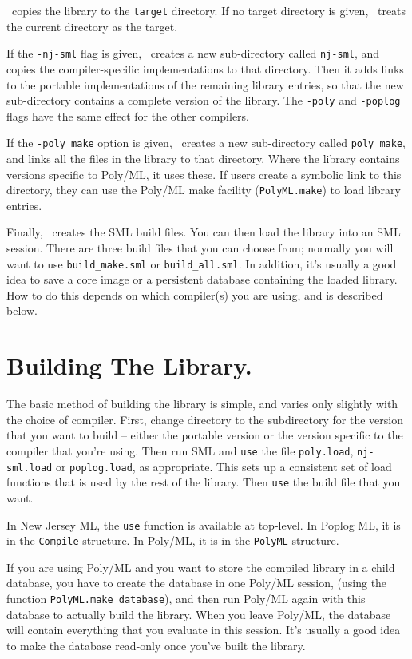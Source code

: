 \install\ copies the library to the {\tt target} directory.
If no target directory is given,
\install\ treats the current directory as the target.

If the {\tt -nj-sml} flag is given, \install\ creates a new
sub-directory called {\tt nj-sml}, and copies the compiler-specific
implementations to that directory.  Then it adds links to the
portable implementations of the remaining library entries, so
that the new sub-directory contains a complete version of the
library.  The {\tt -poly} and {\tt -poplog} flags have the same
effect for the other compilers.

If the {\tt -poly\_make} option is given, \install\ creates a
new sub-directory called {\tt poly\_make}, and
links all the files in the library to that directory.  Where the
library contains versions specific to Poly/ML, it uses these.
If users create a symbolic link to this directory, they can use
the Poly/ML make facility ({\tt PolyML.make}) to load library
entries.

Finally, \install\ creates the SML build files.  You can then load
the library into an SML session.  There are three build files that
you can choose from; normally you will want to use {\tt build\_make.sml}
or {\tt build\_all.sml}.  In addition, it's usually a good idea to
save a core image or a persistent database containing the loaded
library.  How to do this depends on which compiler(s) you are using,
and is described below.


\section{Building The Library.}

The basic method of building the library is simple, and varies only
slightly with the choice of compiler.  First, change directory to the
subdirectory for the version that you want to build -- either
the portable version or the version specific to the compiler
that you're using.  Then run SML and {\tt use} the file {\tt poly.load},
{\tt nj-sml.load} or {\tt poplog.load}, as appropriate.  This sets
up a consistent set of load functions that is used by the rest of
the library.  Then {\tt use} the build file that you want.

In New Jersey ML, the {\tt use} function is available at top-level.
In Poplog ML, it is in the {\tt Compile} structure. In Poly/ML, it is
in the {\tt PolyML} structure.

If you are using Poly/ML and you want to store the compiled library
in a child database, you have to create the database in one Poly/ML
session, (using the function {\tt PolyML.make\_database}), and then run
Poly/ML again with this database to actually build the library.  When you
leave Poly/ML, the database will contain everything that you evaluate
in this session. It's usually a good idea to make the database read-only
once you've built the library.

